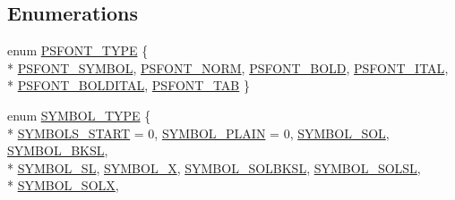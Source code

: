\subsection*{Enumerations}
\begin{DoxyCompactItemize}
\item 
enum \hyperlink{a00216_ab7470ac62bba788b8cac09b1c6635c7e}{P\-S\-F\-O\-N\-T\-\_\-\-T\-Y\-P\-E} \{ \\*
\hyperlink{a00216_ab7470ac62bba788b8cac09b1c6635c7ead428563760b6e9115b740676967a76f0}{P\-S\-F\-O\-N\-T\-\_\-\-S\-Y\-M\-B\-O\-L}, 
\hyperlink{a00216_ab7470ac62bba788b8cac09b1c6635c7ea6956ee0b24e26c1ebf7677fcddff10bd}{P\-S\-F\-O\-N\-T\-\_\-\-N\-O\-R\-M}, 
\hyperlink{a00216_ab7470ac62bba788b8cac09b1c6635c7ea9f06d1e851d5604e6eef13e4e945a27b}{P\-S\-F\-O\-N\-T\-\_\-\-B\-O\-L\-D}, 
\hyperlink{a00216_ab7470ac62bba788b8cac09b1c6635c7ea3af705f059dc49c941b309f61fcf01a1}{P\-S\-F\-O\-N\-T\-\_\-\-I\-T\-A\-L}, 
\\*
\hyperlink{a00216_ab7470ac62bba788b8cac09b1c6635c7ea0a40c357b9f534827c912da13927ff80}{P\-S\-F\-O\-N\-T\-\_\-\-B\-O\-L\-D\-I\-T\-A\-L}, 
\hyperlink{a00216_ab7470ac62bba788b8cac09b1c6635c7eaf359a5da68fa5c73de4de849ac3ea33e}{P\-S\-F\-O\-N\-T\-\_\-\-T\-A\-B}
 \}
\item 
enum \hyperlink{a00216_a68cd84e0300be6f9ff4474682762c9ee}{S\-Y\-M\-B\-O\-L\-\_\-\-T\-Y\-P\-E} \{ \\*
\hyperlink{a00216_a68cd84e0300be6f9ff4474682762c9eea908c7e87e4d6c9e3e96b942c0c31ca7b}{S\-Y\-M\-B\-O\-L\-S\-\_\-\-S\-T\-A\-R\-T} = 0, 
\hyperlink{a00216_a68cd84e0300be6f9ff4474682762c9eea8ccc4eef6da0681aeae7bc0e246ec3d9}{S\-Y\-M\-B\-O\-L\-\_\-\-P\-L\-A\-I\-N} = 0, 
\hyperlink{a00216_a68cd84e0300be6f9ff4474682762c9eea26312fe60897f913fb09a002004bcaab}{S\-Y\-M\-B\-O\-L\-\_\-\-S\-O\-L}, 
\hyperlink{a00216_a68cd84e0300be6f9ff4474682762c9eea70cc8d2cf3f1902847debcbec54fd9a7}{S\-Y\-M\-B\-O\-L\-\_\-\-B\-K\-S\-L}, 
\\*
\hyperlink{a00216_a68cd84e0300be6f9ff4474682762c9eeab84391daaf95f117ca34b0db29a6dfe8}{S\-Y\-M\-B\-O\-L\-\_\-\-S\-L}, 
\hyperlink{a00216_a68cd84e0300be6f9ff4474682762c9eea322bdc54848feafea3100b8751eb49ce}{S\-Y\-M\-B\-O\-L\-\_\-\-X}, 
\hyperlink{a00216_a68cd84e0300be6f9ff4474682762c9eea0e4e8c0e34d5519bb17e1b2467d12428}{S\-Y\-M\-B\-O\-L\-\_\-\-S\-O\-L\-B\-K\-S\-L}, 
\hyperlink{a00216_a68cd84e0300be6f9ff4474682762c9eea229f66761bb65b5b637d33424cb855dd}{S\-Y\-M\-B\-O\-L\-\_\-\-S\-O\-L\-S\-L}, 
\\*
\hyperlink{a00216_a68cd84e0300be6f9ff4474682762c9eea300bb36eafb4dcfd8b774432a62473c5}{S\-Y\-M\-B\-O\-L\-\_\-\-S\-O\-L\-X}, 

\end{DoxyCompactItemize}
